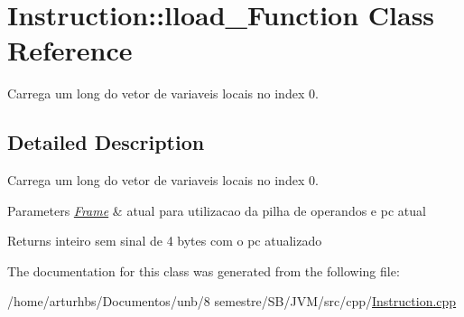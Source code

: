 \hypertarget{classInstruction_1_1lload__0Function}{}\section{Instruction\+:\+:lload\+\_\+Function Class Reference}
\label{classInstruction_1_1lload__0Function}


Carrega um long do vetor de variaveis locais no index 0.  




\subsection{Detailed Description}
Carrega um long do vetor de variaveis locais no index 0. 


\begin{DoxyParams}{Parameters}
{\em \hyperlink{classFrame}{Frame}} & atual para utilizacao da pilha de operandos e pc atual \\
\hline
\end{DoxyParams}
\begin{DoxyReturn}{Returns}
inteiro sem sinal de 4 bytes com o pc atualizado 
\end{DoxyReturn}


The documentation for this class was generated from the following file\+:\begin{DoxyCompactItemize}
\item 
/home/arturhbs/\+Documentos/unb/8 semestre/\+S\+B/\+J\+V\+M/src/cpp/\hyperlink{Instruction_8cpp}{Instruction.\+cpp}\end{DoxyCompactItemize}
